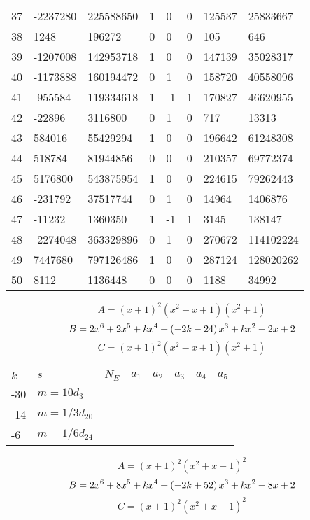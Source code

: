 \documentclass{amsart}
\begin{document}
\begin{longtable}{|l|l|l|lllll|}
37&-2237280&225588650&1&0&0&125537&25833667\\
38&1248&196272&0&0&0&105&646\\
39&-1207008&142953718&1&0&0&147139&35028317\\
40&-1173888&160194472&0&1&0&158720&40558096\\
41&-955584&119334618&1&-1&1&170827&46620955\\
42&-22896&3116800&0&1&0&717&13313\\
43&584016&55429294&1&0&0&196642&61248308\\
44&518784&81944856&0&0&0&210357&69772374\\
45&5176800&543875954&1&0&0&224615&79262443\\
46&-231792&37517744&0&1&0&14964&1406876\\
47&-11232&1360350&1&-1&1&3145&138147\\
48&-2274048&363329896&0&1&0&270672&114102224\\
49&7447680&797126486&1&0&0&287124&128020262\\
50&8112&1136448&0&0&0&1188&34992\\
\hline
\end{longtable}
$$A=(x
 + 1)^{2}(x^2
 - x
 + 1)(x^2
 + 1)$$
$$B=2\*x^6
 + 2\*x^5
 + k\*x^4
 + \left(-2\*k
 - 24\right) \*x^3
 + k\*x^2
 + 2\*x
 + 2$$
$$C=(x
 + 1)^{2}(x^2
 - x
 + 1)(x^2
 + 1)$$
\begin{longtable}{|l|l|l|lllll|}
\hline
$k$ & $s$ & $N_E$ & $a_1$ & $a_2$ & $a_3$ & $a_4$ & $a_5$\\
\hline
-30&$m=10d_{3}$&&\multicolumn{5}{c|}{}\\
-14&$m=1/3d_{20}$&&\multicolumn{5}{c|}{}\\
-6&$m=1/6d_{24}$&&\multicolumn{5}{c|}{}\\
\hline
\end{longtable}
$$A=(x
 + 1)^{2}(x^2
 + x
 + 1)^{2}$$
$$B=2\*x^6
 + 8\*x^5
 + k\*x^4
 + \left(-2\*k
 + 52\right) \*x^3
 + k\*x^2
 + 8\*x
 + 2$$
$$C=(x
 + 1)^{2}(x^2
 + x
 + 1)^{2}$$
\end{document}
